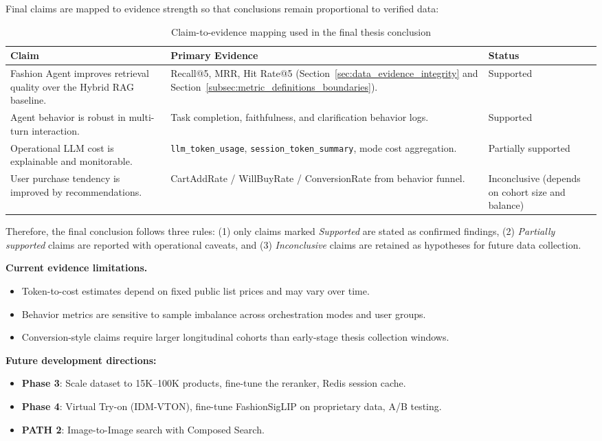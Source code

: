 Final claims are mapped to evidence strength so that conclusions remain proportional to verified data:

\begin{table}[H]
\centering
\begin{tabular}{p{4.0cm}p{5.8cm}p{3.0cm}}
\toprule
\textbf{Claim} & \textbf{Primary Evidence} & \textbf{Status}\\
\midrule
Fashion Agent improves retrieval quality over the Hybrid RAG baseline. & Recall@5, MRR, Hit Rate@5 (Section~\ref{sec:data_evidence_integrity} and Section~\ref{subsec:metric_definitions_boundaries}). & Supported\\
Agent behavior is robust in multi-turn interaction. & Task completion, faithfulness, and clarification behavior logs. & Supported\\
Operational LLM cost is explainable and monitorable. & \texttt{llm\_token\_usage}, \texttt{session\_token\_summary}, mode cost aggregation. & Partially supported\\
User purchase tendency is improved by recommendations. & CartAddRate / WillBuyRate / ConversionRate from behavior funnel. & Inconclusive (depends on cohort size and balance)\\
\bottomrule
\end{tabular}
\caption{Claim-to-evidence mapping used in the final thesis conclusion}
\label{tab:claim_evidence_mapping}
\end{table}

Therefore, the final conclusion follows three rules: (1) only claims marked \textit{Supported} are stated as confirmed findings, (2) \textit{Partially supported} claims are reported with operational caveats, and (3) \textit{Inconclusive} claims are retained as hypotheses for future data collection.

\textbf{Current evidence limitations.}
\begin{itemize}
    \item Token-to-cost estimates depend on fixed public list prices and may vary over time.
    \item Behavior metrics are sensitive to sample imbalance across orchestration modes and user groups.
    \item Conversion-style claims require larger longitudinal cohorts than early-stage thesis collection windows.
\end{itemize}

\textbf{Future development directions:}
\begin{itemize}
    \item \textbf{Phase 3}: Scale dataset to 15K--100K products, fine-tune the reranker, Redis session cache.
    \item \textbf{Phase 4}: Virtual Try-on (IDM-VTON), fine-tune FashionSigLIP on proprietary data, A/B testing.
    \item \textbf{PATH 2}: Image-to-Image search with Composed Search.
\end{itemize}
